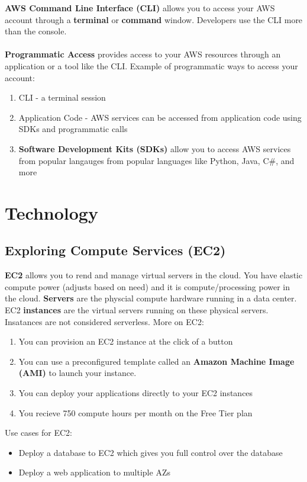 \documentclass{article}%
\begin{document}
\textbf{AWS Command Line Interface (CLI) } allows you to access your AWS account through a \textbf{terminal} or \textbf{command} window. Developers use the CLI more than the console. \\ \\

\textbf{Programmatic Access} provides access to your AWS resources through an application or a tool like the CLI. Example of programmatic ways to access your account:
\begin{enumerate}
    \item CLI - a terminal session
    \item Application Code - AWS services can be accessed from application code using SDKs and programmatic calls
    \item \textbf{Software Development Kits (SDKs)} allow you to access AWS services from popular langauges from popular languages like Python, Java, C\#, and more
\end{enumerate}

\section{Technology}
\subsection{Exploring Compute Services (EC2)}
\textbf{EC2} allows you to rend and manage virtual servers in the cloud. You have elastic compute power (adjusts based on need) and it is compute/processing power in the cloud.
\textbf{Servers} are the physcial compute hardware running in a data center. EC2 \textbf{instances} are the virtual servers running on these physical servers. Insatances are not considered serverless.
More on EC2: 
\begin{enumerate}
    \item You can provision an EC2 instance at the click of a button
    \item You can use a preconfigured template called an \textbf{Amazon Machine Image (AMI)} to launch your instance. 
    \item You can deploy your applications directly to your EC2 instances
    \item You recieve 750 compute hours per month on the Free Tier plan
\end{enumerate}

Use cases for EC2:
\begin{itemize}
    \item Deploy a database to EC2 which gives you full control over the database
    \item Deploy a web application to multiple AZs
\end{itemize}
\end{document}
